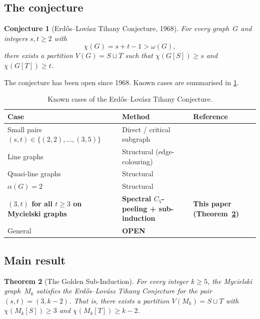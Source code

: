 \documentclass[11pt,a4paper]{amsart}
\theoremstyle{plain}
\newtheorem{theorem}{Theorem}[section]
\newtheorem{conjecture}[theorem]{Conjecture}
\theoremstyle{definition}
\theoremstyle{remark}
\newcommand{\chr}{\chi}
\newcommand{\om}{\omega}
\begin{document}
\subsection{The conjecture}

\begin{conjecture}[Erd\H{o}s--Lov\'asz Tihany Conjecture, 1968]
\label{conj:tihany}
For every graph~$G$ and integers $s,t \geq 2$ with
\[
  \chr(G) = s + t - 1 > \om(G),
\]
there exists a partition $V(G) = S \sqcup T$ such that
$\chr(G[S]) \geq s$ and $\chr(G[T]) \geq t$.
\end{conjecture}

The conjecture has been open since 1968.  Known cases are summarised in
\cref{tab:known-cases}.

\begin{table}[ht]
\centering
\caption{Known cases of the Erd\H{o}s--Lov\'asz Tihany Conjecture.}
\label{tab:known-cases}
\begin{tabular}{lll}
\toprule
Case & Method & Reference \\
\midrule
Small pairs $(s,t) \in \{(2,2),\ldots,(3,5)\}$
  & Direct / critical subgraph
  & \cite{stiebitz1987,sachs1993} \\
Line graphs
  & Structural (edge-colouring)
  & \cite{kostochka2003} \\
Quasi-line graphs
  & Structural
  & \cite{chudnovsky2008} \\
$\alpha(G) = 2$
  & Structural
  & \cite{balogh2009} \\
\textbf{$(3,t)$ for all $t\geq 3$ on Mycielski graphs}
  & \textbf{Spectral $C_5$-peeling + sub-induction}
  & \textbf{This paper (Theorem~\ref{thm:main})} \\
General & \textbf{OPEN} & \\
\bottomrule
\end{tabular}
\end{table}

\subsection{Main result}

\begin{theorem}[The Golden Sub-Induction]\label{thm:main}
For every integer $k \geq 5$, the Mycielski graph~$M_k$ satisfies the
Erd\H{o}s--Lov\'asz Tihany Conjecture for the pair
$(s,t) = (3, k{-}2)$.  That is, there exists a partition
$V(M_k) = S \sqcup T$ with $\chr(M_k[S]) \geq 3$ and
$\chr(M_k[T]) \geq k - 2$.
\end{theorem}
\end{document}
